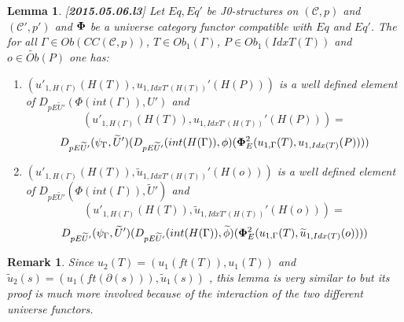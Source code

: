 \documentclass[12pt]{article}
\newtheorem{lemma}[proposition]{Lemma}
\newtheorem{remark}[proposition]{Remark}
\newcommand{\llabel}[1]{\label{#1}[{\bf #1}]}
\newcommand{\wt}{\widetilde}
\begin{document}
\begin{lemma}
\llabel{2015.05.06.l3}
Let $Eq, Eq'$ be J0-structures on $({\mathcal C},p)$ and $({\mathcal C}',p')$ and $\bf\Phi$ be a universe category functor compatible with $Eq$ and $Eq'$. The for all $\Gamma\in Ob(CC({\mathcal C},p))$, $T\in Ob_1(\Gamma)$, $P\in Ob_1(IdxT(T))$ and $o\in \wt{Ob}(P)$ one has:
%
\begin{enumerate}
\item $(u'_{1,H(\Gamma)}(H(T)), u_{1,IdxT'(H(T))}'(H(P)))$ is a well defined element of $D_{pE\wt{U}'}(\Phi(int(\Gamma)),U')$ and
%
$$(u'_{1,H(\Gamma)}(H(T)), u_{1,IdxT'(H(T))}'(H(P)))=$$$$D_{pE\wt{U}'}(\psi_{\Gamma},\wt{U}')(D_{pE\wt{U}'}(int(H(\Gamma)),\phi)({\bf\Phi}_{E}^2(u_{1,\Gamma}(T),u_{1,Idx(T)}(P))))$$
%
\item $(u'_{1,H(\Gamma)}(H(T)), \wt{u}_{1,IdxT'(H(T))}'(H(o)))$ is a well defined element of $D_{pE\wt{U}'}(\Phi(int(\Gamma)),\wt{U}')$ and
%
$$(u'_{1,H(\Gamma)}(H(T)), \wt{u}_{1,IdxT'(H(T))}'(H(o)))=$$$$D_{pE\wt{U}'}(\psi_{\Gamma},\wt{U}')(D_{pE\wt{U}'}(int(H(\Gamma)),\wt{\phi})({\bf\Phi}_{E}^2(u_{1,\Gamma}(T),\wt{u}_{1,Idx(T)}(o))))$$
%
\end{enumerate}
\end{lemma}
%
\begin{remark}\rm
Since $u_2(T)=(u_1(ft(T)),u_1(T))$ and $\wt{u}_2(s)=(u_1(ft(\partial(s))),\wt{u}_1(s))$ , this lemma is very similar to \cite[Lemma 6.1(3,4)]{fromunivwithPi} but its proof is much more involved because of the interaction of the two different universe functors. 
\end{remark}
%
\end{document}
